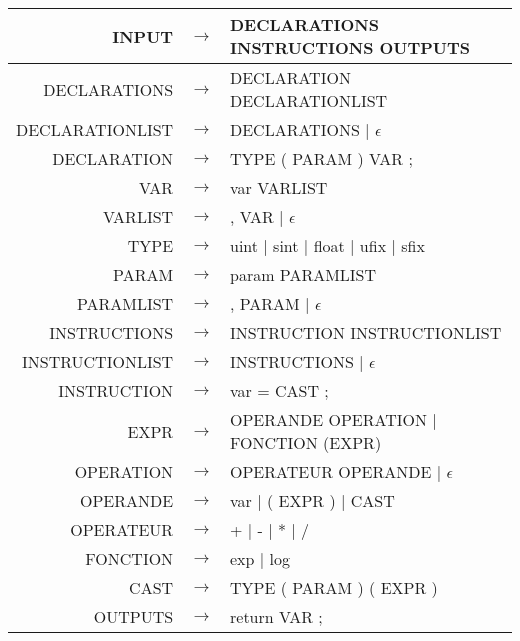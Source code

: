 \documentclass{article}
\begin{document}
\begin{tabular}{rll}
\noindent INPUT & $\rightarrow$ & DECLARATIONS INSTRUCTIONS OUTPUTS\\
\hline
DECLARATIONS & $\rightarrow$ & DECLARATION DECLARATIONLIST\\
DECLARATIONLIST & $\rightarrow$ & DECLARATIONS | $\epsilon$\\
DECLARATION & $\rightarrow$ & TYPE ( PARAM ) VAR ;\\
VAR & $\rightarrow$ & var VARLIST\\
VARLIST & $\rightarrow$ & , VAR | $\epsilon$\\
TYPE & $\rightarrow$ & uint | sint | float | ufix | sfix\\
PARAM & $\rightarrow$ & param PARAMLIST\\
PARAMLIST & $\rightarrow$ & , PARAM | $\epsilon$\\
\hline
INSTRUCTIONS & $\rightarrow$ & INSTRUCTION INSTRUCTIONLIST\\
INSTRUCTIONLIST & $\rightarrow$ & INSTRUCTIONS | $\epsilon$\\
INSTRUCTION & $\rightarrow$ & var = CAST ;\\
EXPR & $\rightarrow$ & OPERANDE OPERATION | FONCTION (EXPR)\\
OPERATION & $\rightarrow$ & OPERATEUR OPERANDE | $\epsilon$\\
OPERANDE & $\rightarrow$ & var | ( EXPR ) | CAST\\
OPERATEUR & $\rightarrow$ & + | - | * | /\\
FONCTION & $\rightarrow$ & exp | log\\
CAST & $\rightarrow$ & TYPE ( PARAM ) ( EXPR )\\
\hline
OUTPUTS & $\rightarrow$ & return VAR ;\\
\end{tabular}
\end{document}

